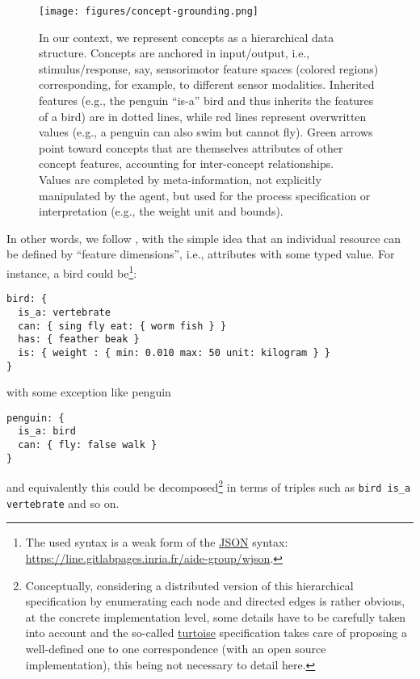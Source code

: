 \documentclass[sn-mathphys]{sn-jnl}
\newcommand{\hhref}[1]{\href{#1}{#1}}
\begin{document}
\begin{figure}[htbp]
\centerline{\texttt{[image: figures/concept-grounding.png]}}
\caption{In our context, we represent concepts as a hierarchical data structure. Concepts are anchored in input/output, i.e., stimulus/response, say, sensorimotor feature spaces (colored regions) corresponding, for example, to different sensor modalities. Inherited features (e.g., the penguin “is-a” bird and thus inherits the features of a bird) are in dotted lines, while red lines represent overwritten values (e.g., a penguin can also swim but cannot fly). Green arrows point toward concepts that are themselves attributes of other concept features, accounting for inter-concept relationships.
\\ Values are completed by meta-information, not explicitly manipulated by the agent, but used for the process specification or interpretation (e.g., the weight unit and bounds).}
\label{concept-grounding}
\end{figure}

In other words, we follow \cite{gardenfors_conceptual_2004}, with the simple idea that an individual resource can be defined by ``feature dimensions'', i.e., attributes with some typed value. For instance, a bird could be\footnote{The used syntax is a weak form of the \href{https://www.json.org}{JSON} syntax: \hhref{https://line.gitlabpages.inria.fr/aide-group/wjson}.}:

\begin{lstlisting}[basicstyle=\small]
bird: {
  is_a: vertebrate
  can: { sing fly eat: { worm fish } }
  has: { feather beak }
  is: { weight : { min: 0.010 max: 50 unit: kilogram } }
}\end{lstlisting}
with some exception like penguin
\begin{lstlisting}[basicstyle=\small]
penguin: {
  is_a: bird
  can: { fly: false walk }
}
\end{lstlisting}

and equivalently this could be decomposed\footnote{Conceptually, considering a distributed version of this hierarchical specification by enumerating each node and directed edges is rather obvious, at the concrete implementation level, some details have to be carefully taken into account and the so-called \href{https://line.gitlabpages.inria.fr/aide-group/wjson/turtoise.pdf}{turtoise} specification takes care of proposing a well-defined one to one correspondence (with an open source implementation), this being not necessary to detail here.} in terms of triples such as {\tt bird is\_a vertebrate} and so on.
\end{document}
